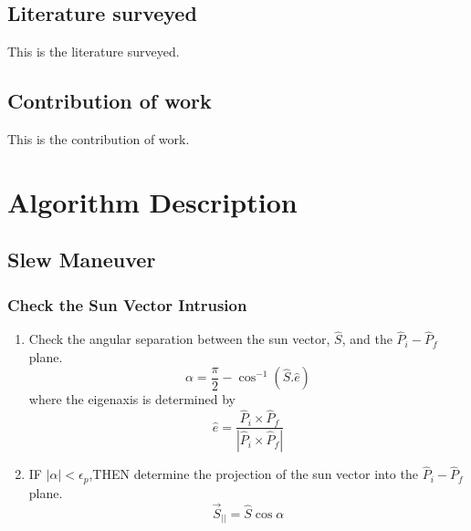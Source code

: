 \documentclass[letterpaper, preprint, paper,11pt]{AAS}	%
\begin{document}
	\clearpage
	\subsection{Literature surveyed}
	
		This is the literature surveyed. 
	
	\subsection{Contribution of work} 
	
		This is the contribution of work. 

\section{Algorithm Description} 

	\subsection{Slew Maneuver} 
	
	
		\subsubsection{Check the Sun Vector Intrusion}
			\begin{enumerate}
				\item Check the angular separation between the sun vector, $\hat{S}$, and the $\hat{P}_i-\hat{P}_f$ plane.
				\begin{equation}
				\alpha=\frac{\pi}{2}-\cos^{-1}(\hat{S}.\hat{e})
				\end{equation}
				where the eigenaxis is determined by
				\begin{equation}\label{eaxis}
				\hat{e}=\frac{\hat{P}_i\times\hat{P}_f}{|\hat{P}_i\times \hat{P}_f|}
				\end{equation} 
				
				\item IF $|\alpha|<\epsilon_p$,THEN determine the projection of the sun vector into the $\hat{P}_i-\hat{P}_f$ plane.
				\begin{equation}\label{Sbar}
				\vec{S}_{||}=\hat{S}\cos\alpha
				\end{equation}
			\end{enumerate}
		
\end{document}
